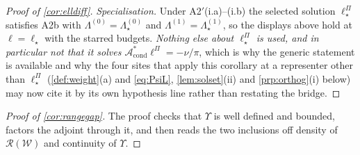\begin{proof}[Proof of \cref{cor:elldiff}]
\emph{Specialisation.} Under A2$'$(i.a)--(i.b) the selected solution $\ell^\Pi_\star$ satisfies A2b with
$\Lambda^{(0)}=\Lambda^{(0)}_\star$ and $\Lambda^{(1)}=\Lambda^{(1)}_\star$, so the displays above hold
at $\ell=\ell_\star$ with the starred budgets. \emph{Nothing else about $\ell^\Pi_\star$ is used, and in
particular not that it solves $\mathcal A^\ast_{\mathrm{cond}}\ell^\Pi=-\nu/\pi$}, which is why the
generic statement is available and why the four sites that apply this corollary at a representer other
than $\ell^\Pi_\star$ (\cref{def:weight}(a) and \eqref{eq:PsiL},
\cref{lem:solset}(ii) and \cref{prp:orthog}(i) below) may now cite it by its own hypothesis line rather
than restating the bridge.
\end{proof}

\begin{proof}[Proof of \cref{cor:rangegap}]
The proof checks that $\Upsilon$ is well defined and bounded, factors the adjoint through it, and then
reads the two inclusions off density of $\mathcal R(\mathcal W)$ and continuity of $\Upsilon$.


\end{proof}
